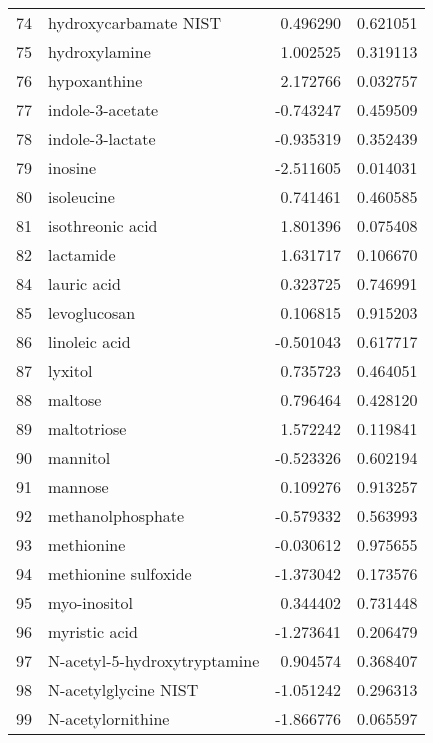 \begin{tabular}{llrr}
74  &              hydroxycarbamate NIST &  0.496290 &  0.621051 \\
75  &                      hydroxylamine &  1.002525 &  0.319113 \\
76  &                       hypoxanthine &  2.172766 &  0.032757 \\
77  &                   indole-3-acetate & -0.743247 &  0.459509 \\
78  &                   indole-3-lactate & -0.935319 &  0.352439 \\
79  &                            inosine & -2.511605 &  0.014031 \\
80  &                         isoleucine &  0.741461 &  0.460585 \\
81  &                   isothreonic acid &  1.801396 &  0.075408 \\
82  &                          lactamide &  1.631717 &  0.106670 \\
84  &                        lauric acid &  0.323725 &  0.746991 \\
85  &                       levoglucosan &  0.106815 &  0.915203 \\
86  &                      linoleic acid & -0.501043 &  0.617717 \\
87  &                            lyxitol &  0.735723 &  0.464051 \\
88  &                            maltose &  0.796464 &  0.428120 \\
89  &                        maltotriose &  1.572242 &  0.119841 \\
90  &                           mannitol & -0.523326 &  0.602194 \\
91  &                            mannose &  0.109276 &  0.913257 \\
92  &                  methanolphosphate & -0.579332 &  0.563993 \\
93  &                         methionine & -0.030612 &  0.975655 \\
94  &               methionine sulfoxide & -1.373042 &  0.173576 \\
95  &                       myo-inositol &  0.344402 &  0.731448 \\
96  &                      myristic acid & -1.273641 &  0.206479 \\
97  &       N-acetyl-5-hydroxytryptamine &  0.904574 &  0.368407 \\
98  &               N-acetylglycine NIST & -1.051242 &  0.296313 \\
99  &                  N-acetylornithine & -1.866776 &  0.065597 \\

\end{tabular}
